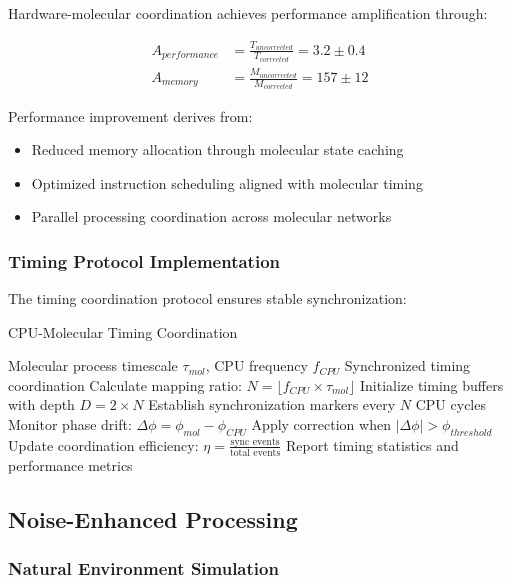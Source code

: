 Hardware-molecular coordination achieves performance amplification through:

\begin{align}
A_{performance} &= \frac{T_{uncorrected}}{T_{corrected}} = 3.2 \pm 0.4 \\
A_{memory} &= \frac{M_{uncorrected}}{M_{corrected}} = 157 \pm 12
\end{align}

Performance improvement derives from:
\begin{itemize}
\item Reduced memory allocation through molecular state caching
\item Optimized instruction scheduling aligned with molecular timing
\item Parallel processing coordination across molecular networks
\end{itemize}

\subsubsection{Timing Protocol Implementation}

The timing coordination protocol ensures stable synchronization:

\begin{algorithm}[H]
\caption{CPU-Molecular Timing Coordination}
\begin{algorithmic}[1]
\REQUIRE Molecular process timescale $\tau_{mol}$, CPU frequency $f_{CPU}$
\ENSURE Synchronized timing coordination
\STATE Calculate mapping ratio: $N = \lfloor f_{CPU} \times \tau_{mol} \rfloor$
\STATE Initialize timing buffers with depth $D = 2 \times N$
\STATE Establish synchronization markers every $N$ CPU cycles
\STATE Monitor phase drift: $\Delta\phi = \phi_{mol} - \phi_{CPU}$
\STATE Apply correction when $|\Delta\phi| > \phi_{threshold}$
\STATE Update coordination efficiency: $\eta = \frac{\text{sync events}}{\text{total events}}$
\STATE Report timing statistics and performance metrics
\end{algorithmic}
\end{algorithm}

\subsection{Noise-Enhanced Processing}

\subsubsection{Natural Environment Simulation}

